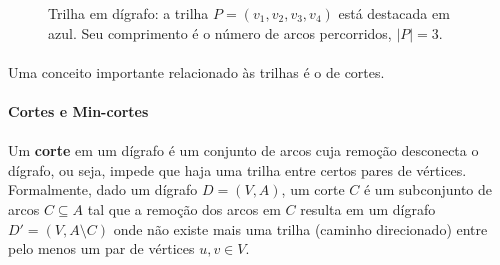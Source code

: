 \documentclass[12pt,a4paper]{article}
\def\\{}%
\begin{document}
\begin{figure}[H]
\centering
{}
\caption{Trilha em dígrafo: a trilha $P=(v_1,v_2,v_3,v_4)$ está destacada em azul. Seu comprimento é o número de arcos percorridos, $|P|=3$.}
\label{fig:trilha}
\end{figure}

\paragraph{}
Uma conceito importante relacionado às trilhas é o de cortes. 

\paragraph{Cortes e Min-cortes}
\paragraph{}
Um \textbf{corte} em um dígrafo é um conjunto de arcos cuja remoção desconecta o dígrafo, ou seja, impede que haja uma trilha entre certos pares de vértices. Formalmente, dado um dígrafo \(D = (V, A)\), um corte \(C\) é um subconjunto de arcos \(C \subseteq A\) tal que a remoção dos arcos em \(C\) resulta em um dígrafo \(D' = (V, A \setminus C)\) onde não existe mais uma trilha (caminho direcionado) entre pelo menos um par de vértices \(u, v \in V\).
\end{document}
